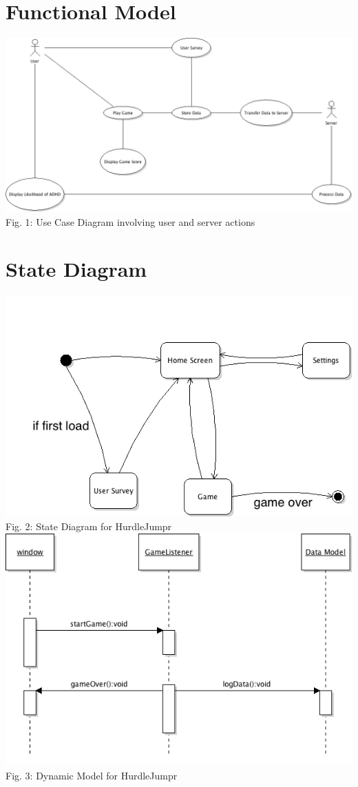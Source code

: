 \documentclass[a4wide]{article}
\begin{document}
\section{Functional Model}
\includegraphics[width=\textwidth]{UseCaseDiagram.png}
\small Fig. 1: Use Case Diagram involving user and server actions
\section{State Diagram}
\includegraphics[width=\textwidth]{StateDiagram.png}
Fig. 2: State Diagram for HurdleJumpr
\includegraphics[width=\textwidth]{dynamicModel.png}
Fig. 3: Dynamic Model for HurdleJumpr
\end{document}
